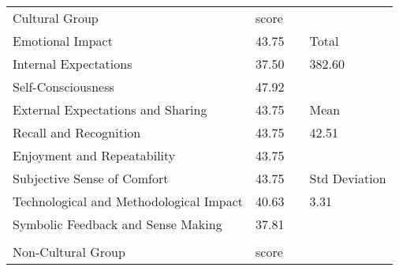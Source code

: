     \begin{table}[ht]
    \begin{tabular}{llll}
    \cline{1-2}
    \multicolumn{1}{|l|}{Cultural Group}                          & \multicolumn{1}{l|}{score} &                       &                                     \\ \cline{1-2} \cline{4-4} 
    \multicolumn{1}{|l|}{Emotional Impact}                        & \multicolumn{1}{l|}{43.75} & \multicolumn{1}{l|}{} & \multicolumn{1}{l|}{Total}          \\ \cline{1-2} \cline{4-4} 
    \multicolumn{1}{|l|}{Internal Expectations}                   & \multicolumn{1}{l|}{37.50} & \multicolumn{1}{l|}{} & \multicolumn{1}{l|}{382.60}         \\ \cline{1-2} \cline{4-4} 
    \multicolumn{1}{|l|}{Self-Consciousness}                      & \multicolumn{1}{l|}{47.92} &                       &                                     \\ \cline{1-2} \cline{4-4} 
    \multicolumn{1}{|l|}{External Expectations and Sharing}       & \multicolumn{1}{l|}{43.75} & \multicolumn{1}{l|}{} & \multicolumn{1}{l|}{Mean}           \\ \cline{1-2} \cline{4-4} 
    \multicolumn{1}{|l|}{Recall and Recognition}                  & \multicolumn{1}{l|}{43.75} & \multicolumn{1}{l|}{} & \multicolumn{1}{l|}{42.51}          \\ \cline{1-2} \cline{4-4} 
    \multicolumn{1}{|l|}{Enjoyment and Repeatability}             & \multicolumn{1}{l|}{43.75} &                       &                                     \\ \cline{1-2} \cline{4-4} 
    \multicolumn{1}{|l|}{Subjective Sense of Comfort}             & \multicolumn{1}{l|}{43.75} & \multicolumn{1}{l|}{} & \multicolumn{1}{l|}{Std  Deviation} \\ \cline{1-2} \cline{4-4} 
    \multicolumn{1}{|l|}{Technological and Methodological Impact} & \multicolumn{1}{l|}{40.63} & \multicolumn{1}{l|}{} & \multicolumn{1}{l|}{3.31}           \\ \cline{1-2} \cline{4-4} 
    \multicolumn{1}{|l|}{Symbolic Feedback and Sense Making}      & \multicolumn{1}{l|}{37.81} &                       &                                     \\ \cline{1-2}
                                                                  &                            &                       &                                     \\ \cline{1-2}
    \multicolumn{1}{|l|}{Non-Cultural Group}                      & \multicolumn{1}{l|}{score} &                       &                                     \\ \cline{1-2} \cline{4-4} 

\end{tabular}
\end{table}
